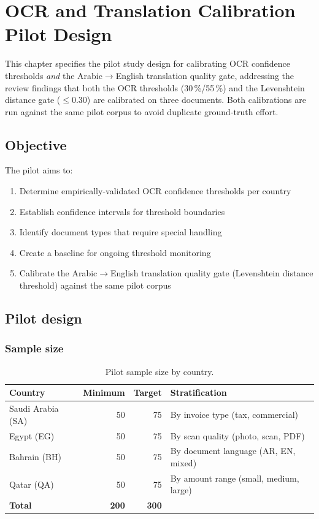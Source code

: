 \chapter{OCR and Translation Calibration Pilot Design}\label{ch:ocr-pilot}

This chapter specifies the pilot study design for calibrating OCR confidence
thresholds \emph{and} the Arabic$\to$English translation quality gate,
addressing the review findings that both the OCR thresholds (30\,\%/55\,\%)
and the Levenshtein distance gate ($\le$0.30) are calibrated on three
documents. Both calibrations are run against the same pilot corpus to avoid
duplicate ground-truth effort.

\section{Objective}

The pilot aims to:
\begin{enumerate}
  \item Determine empirically-validated OCR confidence thresholds per country
  \item Establish confidence intervals for threshold boundaries
  \item Identify document types that require special handling
  \item Create a baseline for ongoing threshold monitoring
  \item Calibrate the Arabic$\to$English translation quality gate
        (Levenshtein distance threshold) against the same pilot corpus
\end{enumerate}

\section{Pilot design}

\subsection{Sample size}

\begin{table}[htbp]
\centering
\caption{Pilot sample size by country.}
\label{tab:pilot-sample}
\footnotesize
\begin{tabularx}{\linewidth}{@{}l r r X@{}}
\toprule
\textbf{Country} & \textbf{Minimum} & \textbf{Target} & \textbf{Stratification} \\ \midrule
Saudi Arabia (SA) & 50 & 75 & By invoice type (tax, commercial) \\
Egypt (EG) & 50 & 75 & By scan quality (photo, scan, PDF) \\
Bahrain (BH) & 50 & 75 & By document language (AR, EN, mixed) \\
Qatar (QA) & 50 & 75 & By amount range (small, medium, large) \\
\textbf{Total} & \textbf{200} & \textbf{300} & \\
\bottomrule
\end{tabularx}
\end{table}

